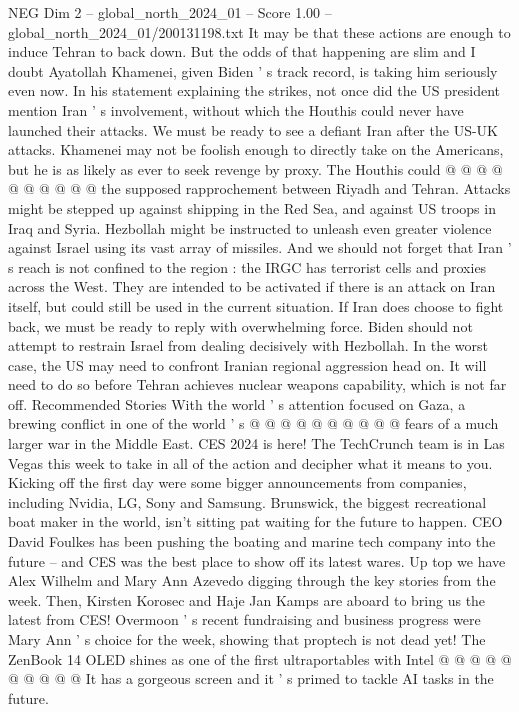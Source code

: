 \begin{textsample}{NEG Dim 2 – global\_north\_2024\_01 – Score 1.00 – global\_north\_2024\_01/200131198.txt}
It may be that these actions are enough to induce Tehran to back down.
But the odds of that happening are slim and I doubt Ayatollah Khamenei, given Biden ' s track record, is taking him seriously even now.
In his statement explaining the strikes, not once did the US president mention Iran ' s involvement, without which the Houthis could never have launched their attacks.
We must be ready to see a defiant Iran after the US-UK attacks.
Khamenei may not be foolish enough to directly take on the Americans, but he is as likely as ever to seek revenge by proxy.
The Houthis could @ @ @ @ @ @ @ @ @ @ the supposed rapprochement between Riyadh and Tehran.
Attacks might be stepped up against shipping in the Red Sea, and against US troops in Iraq and Syria.
Hezbollah might be instructed to unleash even greater violence against Israel using its vast array of missiles.
And we should not forget that Iran ' s reach is not confined to the region : the IRGC has terrorist cells and proxies across the West.
They are intended to be activated if there is an attack on Iran itself, but could still be used in the current situation.
If Iran does choose to fight back, we must be ready to reply with overwhelming force.
Biden should not attempt to restrain Israel from dealing decisively with Hezbollah.
In the worst case, the US may need to confront Iranian regional aggression head on.
It will need to do so before Tehran achieves nuclear weapons capability, which is not far off.
Recommended Stories With the world ' s attention focused on Gaza, a brewing conflict in one of the world ' s @ @ @ @ @ @ @ @ @ @ fears of a much larger war in the Middle East.
CES 2024 is here!
The TechCrunch team is in Las Vegas this week to take in all of the action and decipher what it means to you.
Kicking off the first day were some bigger announcements from companies, including Nvidia, LG, Sony and Samsung.
Brunswick, the biggest recreational boat maker in the world, isn't sitting pat waiting for the future to happen.
CEO David Foulkes has been pushing the boating and marine tech company into the future -- and CES was the best place to show off its latest wares.
Up top we have Alex Wilhelm and Mary Ann Azevedo digging through the key stories from the week.
Then, Kirsten Korosec and Haje Jan Kamps are aboard to bring us the latest from CES!
Overmoon ' s recent fundraising and business progress were Mary Ann ' s choice for the week, showing that proptech is not dead yet!
The ZenBook 14 OLED shines as one of the first ultraportables with Intel @ @ @ @ @ @ @ @ @ @ It has a gorgeous screen and it ' s primed to tackle AI tasks in the future.

\end{textsample}

